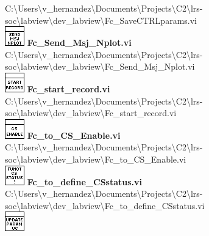 \documentclass[
]{article}
\begin{document}
C:\textbackslash Users\textbackslash v\_hernandez\textbackslash Documents\textbackslash Projects\textbackslash C2\textbackslash lrs-soc\textbackslash labview\textbackslash dev\_labview\textbackslash Fc\_SaveCTRLparams.vi\\
\includegraphics{Fc_Send_Msj_Nplot_viLVtemp20240312184737_8_0.png}
\textbf{Fc\_Send\_Msj\_Nplot.vi\\
}
C:\textbackslash Users\textbackslash v\_hernandez\textbackslash Documents\textbackslash Projects\textbackslash C2\textbackslash lrs-soc\textbackslash labview\textbackslash dev\_labview\textbackslash Fc\_Send\_Msj\_Nplot.vi\\
\includegraphics{Fc_start_record_viLVtemp20240312184737_9_0.png}
\textbf{Fc\_start\_record.vi\\
}
C:\textbackslash Users\textbackslash v\_hernandez\textbackslash Documents\textbackslash Projects\textbackslash C2\textbackslash lrs-soc\textbackslash labview\textbackslash dev\_labview\textbackslash Fc\_start\_record.vi\\
\includegraphics{Fc_to_CS_Enable_viLVtemp20240312184737_10_0.png}
\textbf{Fc\_to\_CS\_Enable.vi\\
}
C:\textbackslash Users\textbackslash v\_hernandez\textbackslash Documents\textbackslash Projects\textbackslash C2\textbackslash lrs-soc\textbackslash labview\textbackslash dev\_labview\textbackslash Fc\_to\_CS\_Enable.vi\\
\includegraphics{Fc_to_define_CSstatus_viLVtemp20240312184737_11_0.png}
\textbf{Fc\_to\_define\_CSstatus.vi\\
}
C:\textbackslash Users\textbackslash v\_hernandez\textbackslash Documents\textbackslash Projects\textbackslash C2\textbackslash lrs-soc\textbackslash labview\textbackslash dev\_labview\textbackslash Fc\_to\_define\_CSstatus.vi\\
\includegraphics{Fc_update_params_from_uc_viLVtemp20240312184737_12_0.png}
\end{document}
